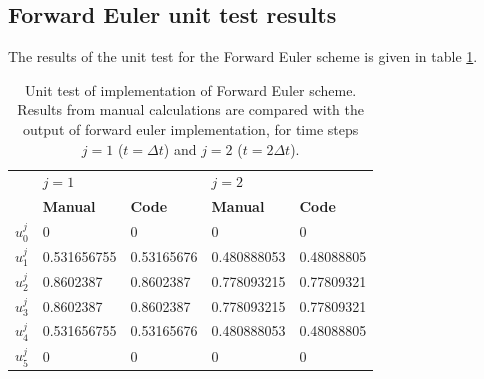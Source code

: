 \documentclass[12pt]{extarticle}
\begin{document}
\subsection{Forward Euler unit test results} \label{app:unit_test}
The results of the unit test for the Forward Euler scheme is given in table \ref{tab:unit_test}.  
\begin{table}[h]
	\centering
	\begin{tabular}{l|ll|ll|}
		\cline{2-5}
		& \multicolumn{2}{l|}{\textbf{$j=1$}}                 & \multicolumn{2}{l|}{\textbf{$j=2$}}                  \\ \cline{2-5} 
		& \multicolumn{1}{l|}{\textbf{Manual}} & \textbf{Code} & \multicolumn{1}{l|}{\textbf{Manual}} & \textbf{Code} \\ \hline
		\multicolumn{1}{|l|}{$u_0^j$} & \multicolumn{1}{l|}{0}               & 0             & \multicolumn{1}{l|}{0}               & 0             \\ \hline
		\multicolumn{1}{|l|}{$u_1^j$} & \multicolumn{1}{l|}{0.531656755}     & 0.53165676    & \multicolumn{1}{l|}{0.480888053}     & 0.48088805    \\ \hline
		\multicolumn{1}{|l|}{$u_2^j$} & \multicolumn{1}{l|}{0.8602387}       & 0.8602387     & \multicolumn{1}{l|}{0.778093215}     & 0.77809321    \\ \hline
		\multicolumn{1}{|l|}{$u_3^j$} & \multicolumn{1}{l|}{0.8602387}       & 0.8602387     & \multicolumn{1}{l|}{0.778093215}     & 0.77809321    \\ \hline
		\multicolumn{1}{|l|}{$u_4^j$} & \multicolumn{1}{l|}{0.531656755}     & 0.53165676    & \multicolumn{1}{l|}{0.480888053}     & 0.48088805    \\ \hline
		\multicolumn{1}{|l|}{$u_5^j$} & \multicolumn{1}{l|}{0}               & 0             & \multicolumn{1}{l|}{0}               & 0             \\ \hline
	\end{tabular}
	\caption{Unit test of implementation of Forward Euler scheme. Results from manual calculations are compared with the output of forward euler implementation, for time steps $j=1$ ($t = \Delta t$) and $j=2$ ($t = 2\Delta t$).}
	\label{tab:unit_test}
\end{table}




\end{document}
